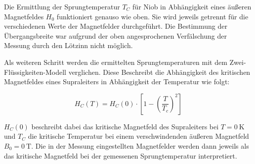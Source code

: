 \documentclass[bigchapter,colorback,accentcolor=tud4b,linedtoc,11pt]{tudreport}
\numberwithin{equation}{subsection}
\begin{document}
Die Ermittlung der Sprungtemperatur \(T_C\) für Niob in Abhängigkeit eines äußeren Magnetfeldes \(H_0\) funktioniert genauso wie oben. Sie wird jeweils getrennt für die verschiedenen Werte der Magnetfelder durchgeführt. Die Bestimmung der Übergangsbreite war aufgrund der oben angesprochenen Verfälschung der Messung durch den Lötzinn nicht möglich.

Als weiteren Schritt werden die ermittelten Sprungtemperaturen mit dem Zwei-Flüssigkeiten-Modell verglichen. Diese Beschreibt die Abhängigkeit des kritischen Magnetfeldes eines Supraleiters in Abhängigkeit der Temperatur wie folgt:

\begin{equation}
  H_C(T) = H_C(0) \cdot \left[ 1- \left(\frac{T}{T_c}\right)^2\right]
\end{equation}

\(H_C(0)\) beschreibt dabei das kritische Magnetfeld des Supraleiters bei \(T = 0 \ \mathrm{K}\) und \(T_C\) die kritische Temperatur bei einem verschwindenden äußeren Magnetfeld \(B_0=0\ \mathrm{T}\). Die in der Messung eingestellten Magnetfelder werden dann jeweils als das kritische Magnetfeld bei der gemessenen Sprungtemperatur interpretiert.
\end{document}
